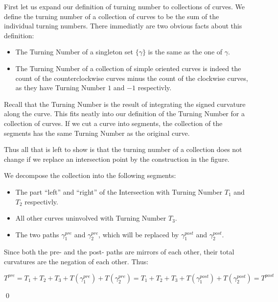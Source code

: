 \documentclass[a4paper,11pt,notitlepage,fullpage]{article}
\begin{document}
\begin{enumerate}
First let us expand our definition of turning number to collections of curves. We define the turning number of a collection of curves to be the sum of the individual turning numbers. There immediatly are two obvious facts about this definition:

\begin{itemize}
\item The Turning Number of a singleton set $\{\gamma\}$ is the same as the one of $\gamma$.
\item The Turning Number of a collection of simple oriented curves is indeed the count of the counterclockwise curves minus the count of the clockwise curves, as they have Turning Number $1$ and $-1$ respectivly.
\end{itemize}

Recall that the Turning Number is the result of integrating the signed curvature along the curve. This fits neatly into our definition of the Turning Number for a collection of curves. If we cut a curve into segments, the collection of the segments has the same Turning Number as the original curve.

Thus all that is left to show is that the turning number of a collection does not change if we replace an intersection point by the construction in the figure. 

\begin{figure}[H]
\centering
\def\svgwidth{0.8\textwidth}

\end{figure}

We decompose the collection into the following segments:
\begin{itemize}
\item The part ``left'' and ``right'' of the Intersection with Turning Number $T_1$ and $T_2$ respectivly.
\item All other curves uninvolved with Turning Number $T_3$.
\item The two paths $\gamma_1^{pre}$ and $\gamma_2^{pre}$, which will be replaced by $\gamma_1^{post}$ and $\gamma_2^{post}$.
\end{itemize}

Since both the pre- and the post- paths are mirrors of each other, their total curvatures are the negation of each other. Thus:

\begin{equation*}
T^{pre} = T_1 + T_2 + T_3 + T(\gamma_1^{pre}) + T(\gamma_2^{pre}) = T_1 + T_2 + T_3 + T(\gamma_1^{post}) + T(\gamma_2^{post}) = T^{post}
\end{equation*}

\qed

\end{enumerate}
\end{document}

